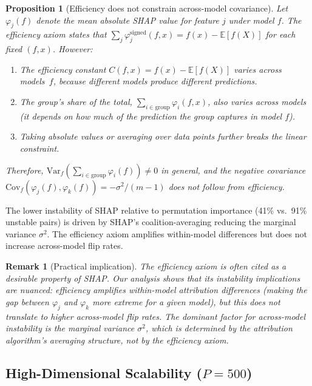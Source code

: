 \documentclass{article}
\newtheorem{proposition}[theorem]{Proposition}
\newtheorem{remark}[theorem]{Remark}
\begin{document}
\begin{proposition}[Efficiency does not constrain across-model covariance]
\label{prop:no-across-model}
Let $\varphi_j(f)$ denote the mean absolute SHAP value for feature $j$
under model $f$.  The efficiency axiom states that
$\sum_j \varphi_j^{\mathrm{signed}}(f,x) = f(x) - \mathbb{E}[f(X)]$
for each fixed $(f,x)$.  However:
\begin{enumerate}
\item The efficiency constant $C(f,x) = f(x) - \mathbb{E}[f(X)]$
  \emph{varies across models}~$f$, because different models produce
  different predictions.
\item The group's share of the total,
  $\sum_{i \in \text{group}} \varphi_i(f,x)$, also varies across
  models (it depends on how much of the prediction the group captures
  in model $f$).
\item Taking absolute values or averaging over data points further
  breaks the linear constraint.
\end{enumerate}
Therefore, $\mathrm{Var}_f(\sum_{i \in \text{group}} \varphi_i(f))
\neq 0$ in general, and the negative covariance
$\mathrm{Cov}_f(\varphi_j(f), \varphi_k(f)) = -\sigma^2/(m-1)$
does \emph{not} follow from efficiency.
\end{proposition}

The lower instability of SHAP relative to permutation importance (41\% vs.\ 91\% unstable pairs) is driven by SHAP's coalition-averaging reducing the marginal variance $\sigma^2$. The efficiency axiom amplifies within-model differences but does not increase across-model flip rates.

\begin{remark}[Practical implication]
The efficiency axiom is often cited as a desirable property of SHAP.
Our analysis shows that its instability implications are nuanced:
efficiency amplifies within-model attribution differences (making the
gap between $\varphi_j$ and $\varphi_k$ more extreme for a given model),
but this does not translate to higher across-model flip rates.  The
dominant factor for across-model instability is the marginal variance
$\sigma^2$, which is determined by the attribution algorithm's
averaging structure, not by the efficiency axiom.
\end{remark}

\subsection{High-Dimensional Scalability ($P = 500$)}
\end{document}

